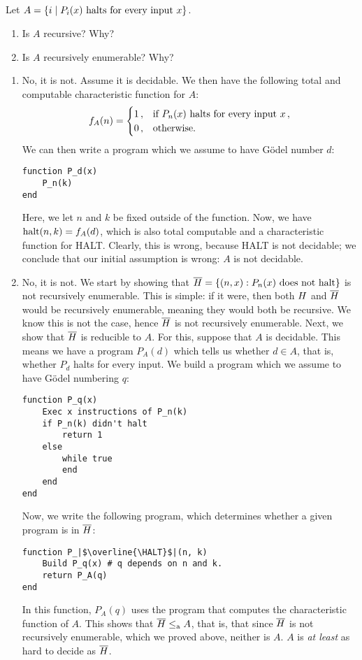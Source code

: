 \subsection{} %
Let \(A = \{i \mid P_i(x) \textnormal{ halts for every input } x\}\).
\begin{enumerate}
	\item Is \(A\) recursive? Why?
	\item Is \(A\) recursively enumerable? Why?
\end{enumerate}

\begin{solution}
\begin{enumerate}
\item No, it is not.
Assume it is decidable.
We then have the following
total and computable characteristic function for \(A\):
\[
f_A(n) =
\begin{cases}
1\,, & \textnormal{if } P_n(x) \textnormal{ halts for every input } x\,,\\
0\,, & \textnormal{otherwise.}
\end{cases}
\]
We can then write a program which we assume to have Gödel number \(d\):
\begin{verbatim}
function P_d(x)
	P_n(k)
end
\end{verbatim}
Here, we let \(n\) and \(k\) be fixed outside of the function.
Now, we have \(\mathrm{halt}(n, k) = f_A(d)\),
which is also total computable and a characteristic function for HALT.
Clearly, this is wrong, because HALT is not decidable;
we conclude that our initial assumption is wrong: \(A\) is not decidable.
\item No, it is not.
We start by showing that
\(\overline{H} = \{(n, x) : P_n(x) \textnormal{ does not halt}\}\)
is not recursively enumerable.
This is simple: if it were, then both \(H\) and \(\overline{H}\)
would be recursively enumerable, meaning they would both be recursive.
We know this is not the case,
hence \(\overline{H}\) is not recursively enumerable.
Next, we show that \(\overline{H}\) is reducible to \(A\).
For this, suppose that \(A\) is decidable.
This means we have a program \(P_A(d)\)
which tells us whether \(d \in A\), that is,
whether \(P_d\) halts for every input.
We build a program which we assume to have Gödel numbering \(q\):
\begin{verbatim}
function P_q(x)
	Exec x instructions of P_n(k)
	if P_n(k) didn't halt
		return 1
	else
		while true
		end
	end
end
\end{verbatim}
Now, we write the following program,
which determines whether a given program is in \(\overline{H}\):
\begin{verbatim}
function P_|$\overline{\HALT}$|(n, k)
	Build P_q(x) # q depends on n and k.
	return P_A(q)
end
\end{verbatim}
In this function, \(P_A(q)\) uses the program
that computes the characteristic function of \(A\).
This shows that \(\overline{H} \le_\textnormal{a} A\),
that is, that since \(\overline{H}\) is not recursively enumerable,
which we proved above,
neither is \(A\).
\(A\) is \emph{at least} as hard to decide as \(\overline{H}\).


\end{enumerate}
\end{solution}
